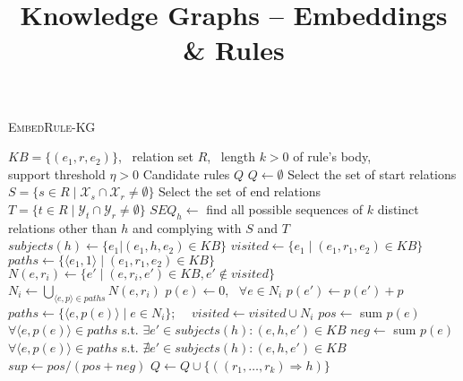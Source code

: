 \documentclass[a4paper,9pt]{article}
\begin{document}
\title{Knowledge Graphs -- Embeddings \& Rules}


\author{\vspace{10mm}}

\maketitle 



\begin{algorithm}[h!]
\caption{\textsc{EmbedRule-KG}}
\label{alg:embedrulekg}
\begin{algorithmic}[1]
\small
\REQUIRE $KB = \{(e_1,r, e_2)\}$, \ relation set $R$, \ length $k > 0$ of rule's body,\  \\  support threshold $\eta > 0$
\ENSURE Candidate rules $Q$
\STATE $Q \gets \emptyset$
	\STATE Select the set of start relations $S = \{s \in R \mid \mathcal{X}_s \cap \mathcal{X}_r \neq \emptyset\}$
	\STATE Select the set of end relations $T = \{t \in R \mid \mathcal{Y}_t \cap \mathcal{Y}_r \neq \emptyset\}$
	\STATE $SEQ_h \gets $ find all possible sequences of $k$ distinct relations other than $h$ and complying with $S$ and $T$ 
	\vspace{1mm}
	\\
	\STATE $subjects(h) \gets \{e_1 | (e_1,h,e_2) \in KB\}$
		\STATE $visited \gets \{e_1 \mid (e_1,r_1,e_2) \in KB \}$
		\STATE $paths \gets \{\langle e_1, 1 \rangle \mid (e_1,r_1,e_2) \in KB \}$
				\STATE $N(e,r_i) \gets \{e' \mid (e,r_i,e') \in KB, e' \notin visited\}$\\\hfill{}
			\ENDFOR
			\STATE $N_i \gets \bigcup_{\langle e, p\rangle \in paths} N(e,r_i) $
			\STATE $p(e) \gets 0$, \ $\forall e \in N_i$
				\STATE $p(e') \gets p(e') + p$
			\ENDFOR
			\STATE $paths \gets \{\langle e, p(e) \rangle \mid e \in N_i \}$; \ \ $visited \gets visited \cup N_i$
		\ENDFOR
			\STATE $pos \gets $ sum $p(e)$ $\forall \langle e, p(e) \rangle \in paths$ s.t. $\exists e' \in subjects(h) : (e,h,e') \in KB$
			\STATE $neg \gets $ sum $p(e)$ $\forall \langle e, p(e) \rangle \in paths$ s.t. $\nexists e' \in subjects(h) : (e,h,e') \in KB$
			\STATE $sup \gets pos/(pos+neg)$
				\STATE $Q \gets Q \cup \{((r_1, \ldots, r_k) \Rightarrow h)\}$
			\ENDIF
		\ENDIF 
	\ENDFOR
\ENDFOR
\end{algorithmic}
\end{algorithm}
\end{document}
